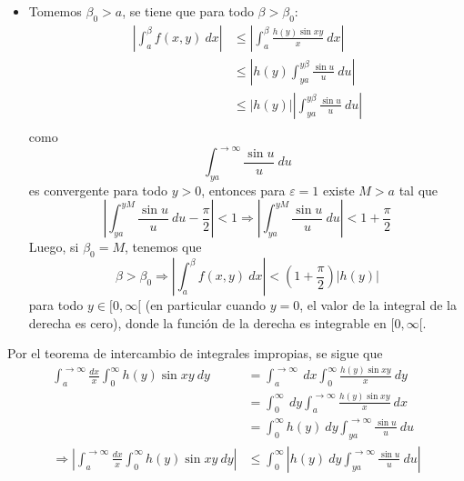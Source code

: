 \documentclass[12pt]{report}
\newcounter{it}
\theoremstyle{largebreak}
\renewcommand{\leq}{\ensuremath{\leqslant}}
\newcommand\abs[1]{\ensuremath{\left|#1\right|}}
\begin{document}
\begin{sol}
\begin{itemize}
            \item Tomemos $\beta_0>a$, se tiene que para todo $\beta>\beta_0$:
            \begin{equation*}
                \begin{split}
                    \abs{\int_{a}^{\beta}f(x,y)\:dx}&\leq\abs{\int_{a}^{\beta}\frac{h(y)\sin xy}{x}\:dx}\\
                    &\leq\abs{h(y)\int_{ya}^{y\beta}\frac{\sin u}{u}\:du}\\
                    &\leq\abs{h(y)}\abs{\int_{ya}^{y\beta}\frac{\sin u}{u}\:du}\\
                \end{split}
            \end{equation*}
            como
            \begin{equation*}
                \int_{ya}^{ \rightarrow\infty}\frac{\sin u}{u}\:du
            \end{equation*}
            es convergente para todo $y>0$, entonces para $\varepsilon=1$ existe $M>a$ tal que
            \begin{equation*}
                \abs{\int_{ ya}^{yM}\frac{\sin u}{u}\:du-\frac{\pi}{2}}<1\Rightarrow\abs{\int_{ ya}^{yM}\frac{\sin u}{u}\:du}<1+\frac{\pi}{2}
            \end{equation*}
            Luego, si $\beta_0=M$, tenemos que
            \begin{equation*}
                \beta>\beta_0\Rightarrow\abs{\int_{a}^{\beta}f(x,y)\:dx}<\left(1+\frac{\pi}{2}\right)\abs{h(y)}
            \end{equation*}
            para todo $y\in[0,\infty[$ (en particular cuando $y=0$, el valor de la integral de la derecha es cero), donde la función de la derecha es integrable en $[0,\infty[$.
        \end{itemize}
        Por el teorema de intercambio de integrales impropias, se sigue que
        \begin{equation*}
            \begin{split}
                \int_{a}^{ \rightarrow\infty}\frac{dx}{x}\int_0^{\infty}h(y)\sin xy\:dy&=\int_{a}^{ \rightarrow\infty}\:dx\int_0^{\infty}\frac{h(y)\sin xy}{x}\:dy\\
                &=\int_0^{\infty}\:dy\int_{a}^{ \rightarrow\infty}\frac{h(y)\sin xy}{x}\:dx\\
                &=\int_0^{\infty}h(y)\:dy\int_{ya}^{ \rightarrow\infty}\frac{\sin u}{u}\:du\\
                \Rightarrow\abs{\int_{a}^{ \rightarrow\infty}\frac{dx}{x}\int_0^{\infty}h(y)\sin xy\:dy}&\leq\int_0^{\infty}\abs{h(y)\:dy\int_{ya}^{ \rightarrow\infty}\frac{\sin u}{u}\:du}\\

\end{split}
\end{equation*}
\end{sol}
\end{document}
